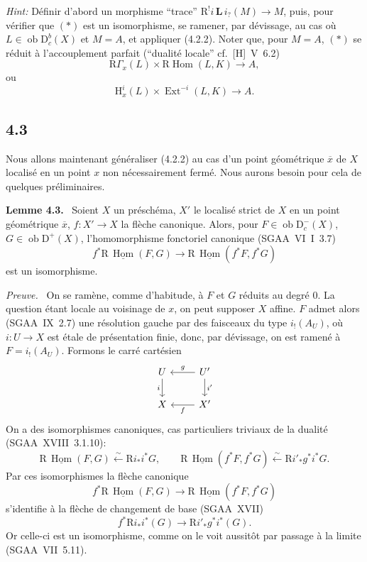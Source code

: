 \documentclass[11pt]{article}
\newenvironment{statement}[1]{\par\medskip\noindent\textbf{#1.}\ }{\par\medskip}
\newenvironment{prooftext}[1][Proof]{\par\noindent\emph{#1.}\ }{\par\medskip}
\renewcommand{\H}{\mathrm{H}}
\DeclareMathOperator{\Hom}{Hom}
\DeclareMathOperator{\Ext}{Ext}
\newcommand{\R}{\mathrm{R}}
\newcommand{\D}{\mathrm{D}}
\newcommand{\ob}{\operatorname{ob}}
\newcommand{\ol}[1]{\overline{#1}}
\providecommand{\Hom}{\operatorname{Hom}}
\providecommand{\ob}{\operatorname{ob}}
\providecommand{\R}{\mathrm R}
\providecommand{\Hom}{\operatorname{Hom}}
\begin{document}
\emph{Hint:} Définir d'abord un morphisme ``trace'' $\R^{!}i\,\mathbf L\, i_?(M)\to M$, puis, pour vérifier que $(*)$ est un isomorphisme, se ramener, par dévissage, au cas où $L\in\ob\D_c^b(X)$ et $M=A$, et appliquer (4.2.2). Noter que, pour $M=A$, $(*)$ se réduit à l'accouplement parfait (``dualité locale'' cf.~[H]~V~6.2)
\[
\R\Gamma_x(L)\times \R\Hom(L,K)\longrightarrow A,
\]
ou
\[
\H_x^i(L)\times \Ext^{-i}(L,K)\longrightarrow A.
\]

\subsection*{4.3}
Nous allons maintenant généraliser (4.2.2) au cas d'un point géométrique $\ol{x}$ de $X$ localisé en un point $x$ non nécessairement fermé. Nous aurons besoin pour cela de quelques préliminaires.

\begin{statement}{Lemme 4.3}
Soient $X$ un préschéma, $X'$ le localisé strict de $X$ en un point géométrique $\ol{x}$, $f:X'\to X$ la flèche canonique. Alors, pour $F\in\ob\D_c^-(X)$, $G\in\ob\D^+(X)$, l'homomorphisme fonctoriel canonique (SGAA~VI~I~3.7)
\[
f^*\R\,\underline{\Hom}(F,G)\longrightarrow \R\,\underline{\Hom}(f^*F,f^*G)
\]
est un isomorphisme.
\end{statement}

\begin{prooftext}[Preuve]
On se ramène, comme d'habitude, à $F$ et $G$ réduits au degré $0$. La question étant locale au voisinage de $x$, on peut supposer $X$ affine. $F$ admet alors (SGAA~IX~2.7) une résolution gauche par des faisceaux du type $i_!(A_U)$, où $i:U\to X$ est étale de présentation finie, donc, par dévissage, on est ramené à $F=i_!(A_U)$. Formons le carré cartésien
\[
\begin{tikzcd}
U \arrow[d,"i"'] & U' \arrow[l,"g"'] \arrow[d,"i'"] \\
X & X' \arrow[l,"f"]
\end{tikzcd}
\]
On a des isomorphismes canoniques, cas particuliers triviaux de la dualité (SGAA~XVIII~3.1.10):
\[
\R\,\underline{\Hom}(F,G)\xleftarrow{\sim}\R i_* i^*G,
\qquad
\R\,\underline{\Hom}(f^*F,f^*G)\xleftarrow{\sim}\R i'_* g^*i^*G.
\]
Par ces isomorphismes la flèche canonique
\[
f^*\R\,\underline{\Hom}(F,G)\longrightarrow \R\,\underline{\Hom}(f^*F,f^*G)
\]
s'identifie à la flèche de changement de base (SGAA~XVII)
\[
f^*\R i_*i^*(G)\longrightarrow \R i'_*g^*i^*(G).
\]
Or celle-ci est un isomorphisme, comme on le voit aussitôt par passage à la limite (SGAA~VII~5.11).
\end{prooftext}
\end{document}
